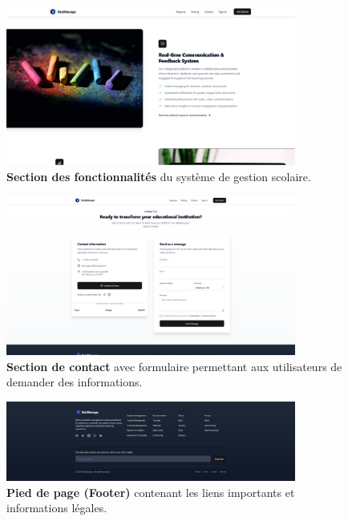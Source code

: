 \begin{figure}[H]
  \centering
  \includegraphics[width=0.85\textwidth,keepaspectratio]{pfe-pics/landing/Screenshot 2025-06-09 at 23-12-17 Vite React TS.png}
  \caption{\textbf{Section des fonctionnalités} du système de gestion scolaire.}
  \label{fig:landing_features}
\end{figure}

\begin{figure}[H]
  \centering
  \includegraphics[width=0.85\textwidth,keepaspectratio]{pfe-pics/landing/contact.png}
  \caption{\textbf{Section de contact} avec formulaire permettant aux utilisateurs de demander des informations.}
  \label{fig:landing_contact}
\end{figure}

\begin{figure}[H]
  \centering
  \includegraphics[width=0.85\textwidth,keepaspectratio]{pfe-pics/landing/fotter.png}
  \caption{\textbf{Pied de page (Footer)} contenant les liens importants et informations légales.}
  \label{fig:landing_footer}
\end{figure}

